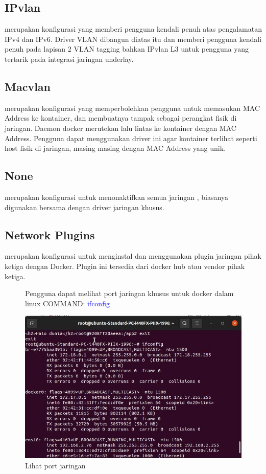 \subsection{IPvlan}
merupakan konfigurasi yang memberi pengguna kendali penuh atas pengalamatan IPv4 dan IPv6. Driver VLAN dibangun diatas itu dan memberi pengguna kendali penuh pada lapisan 2 VLAN tagging bahkan IPvlan L3 untuk 
pengguna yang tertarik pada integrasi jaringan underlay.
\subsection{Macvlan}
merupakan konfigurasi yang memperbolehkan pengguna untuk memasukan MAC Address ke kontainer, dan membuatnya tampak sebagai perangkat fisik di jaringan. Daemon docker merutekan lalu lintas ke kontainer dengan MAC Address.
Pengguna dapat menggunakan driver ini agar kontainer terlihat seperti host fisik di jaringan, masing masing dengan MAC Address yang unik.
\subsection{None}
merupakan konfigurasi untuk menonaktifkan semua jaringan , biasanya digunakan bersama dengan driver jaringan khusus.
\subsection{Network Plugins}
merupakan konfigurasi untuk menginstal dan menggunakan plugin jaringan pihak ketiga dengan Docker. Plugin ini tersedia dari docker hub atau vendor pihak ketiga. 

\begin{figure}
    Pengguna dapat melihat port jaringan khusus untuk docker dalam linux 
    COMMAND: \textcolor{Blue}{ifconfig}
    \begin{center}
        \includegraphics[width=\linewidth]{image/49.jpg}
        \caption{Lihat port jaringan}
        \label{fig:my_figure}
    \end{center}

\end{figure}

